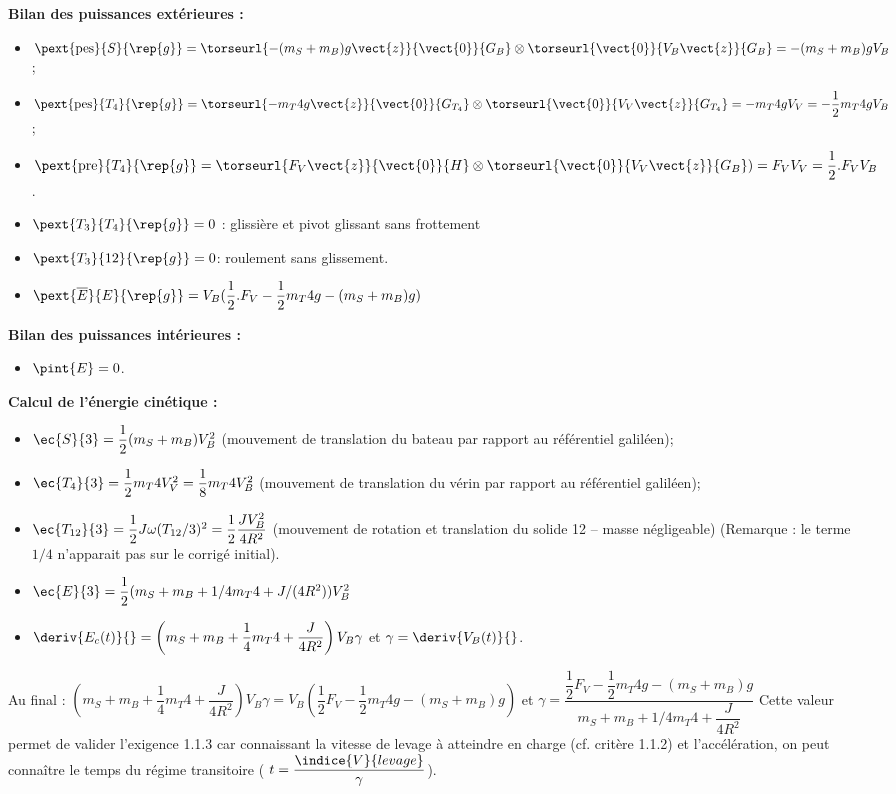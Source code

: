 \begin{corrige}
\textbf{Bilan des puissances extérieures :}
\begin{itemize}
\item $\pext{\text{pes}}{S}{\rep{g}}=\torseurl{-(m_S+m_B )g\vect{z}}{\vect{0}}{G_B} \otimes \torseurl{\vect{0}}{V_B \vect{z}}{G_B} = -(m_S+m_B )gV_B$;
\item $\pext{\text{pes}}{T_4}{\rep{g}}=\torseurl{-m_T4 g\vect{z}}{\vect{0}}{G_{T_4}} \otimes \torseurl{\vect{0}}{V_V \vect{z}}{G_{T_4}}=-m_T4 gV_V=-\dfrac{1}{2} m_T4 gV_B$;
\item $\pext{\text{pre}}{T_4}{\rep{g}}=\torseurl{F_V \vect{z}}{\vect{0}}{H} \otimes \torseurl{\vect{0}}{V_V \vect{z}}{G_B})=F_V V_V=\dfrac{1}{2}.F_V V_B$.
\item $\pext{T_3}{T_4}{\rep{g}}=0$ : glissière et pivot glissant sans frottement
\item $\pext{T_3}{12}{\rep{g}}=0 $: roulement sans glissement.
\item $\pext{\overline{E}}{E}{\rep{g}}=V_B (\dfrac{1}{2}.F_V-\dfrac{1}{2} m_T4 g-(m_S+m_B )g)$
\end{itemize}

\textbf{Bilan des puissances intérieures :}
\begin{itemize}
\item $\pint{E}=0$.
\end{itemize}

\textbf{Calcul de l’énergie cinétique :}
\begin{itemize}
\item $\ec{S}{3}=\dfrac{1}{2} (m_S+m_B ) V_B^2$ (mouvement de translation du bateau par rapport au référentiel galiléen);
\item $\ec{T_4}{3}=\dfrac{1}{2} m_T4 V_V^2=\dfrac{1}{8} m_T4 V_B^2$ (mouvement de translation du vérin par rapport au référentiel galiléen);
\item $\ec{T_{12}}{3}=\dfrac{1}{2} J\omega(T_{12}/3)^2=\dfrac{1}{2}  \dfrac{JV_B^2}{4R^2}$ (mouvement de rotation et translation du solide 12 -- masse négligeable) (Remarque : le terme $1/4$ n’apparait pas sur le corrigé initial).
\item $\ec{E}{3}=\dfrac{1}{2} (m_S+m_B+1/4 m_T4+J/(4R^2 )) V_B^2$
\item $\deriv{E_c(t)}{}=\left(m_S+m_B+\dfrac{1}{4}m_T4+\dfrac{J}{4R^2 }\right) V_B \gamma$ et $\gamma=\deriv{V_B(t)}{}$.
\end{itemize}

Au final :
$\left(m_S+m_B+\dfrac{1}{4} m_T4+\dfrac{J}{4R^2 }\right) V_B \gamma=V_B \left(\dfrac{1}{2}F_V-\dfrac{1}{2} m_T4 g-(m_S+m_B )g\right)$
et 
$\gamma =\dfrac{\dfrac{1}{2} F_V-\dfrac{1}{2} m_T4 g-(m_S+m_B )g}{m_S+m_B+1/4 m_T4+\dfrac{J}{4R^2}}$
Cette valeur permet de valider l’exigence 1.1.3 car connaissant la vitesse de levage à atteindre en charge (cf. critère 1.1.2) et l'accélération, on peut connaître le temps du régime transitoire ( $t=\dfrac{\indice{V}{levage}}{\gamma}$).
\end{corrige}
\else
\fi



